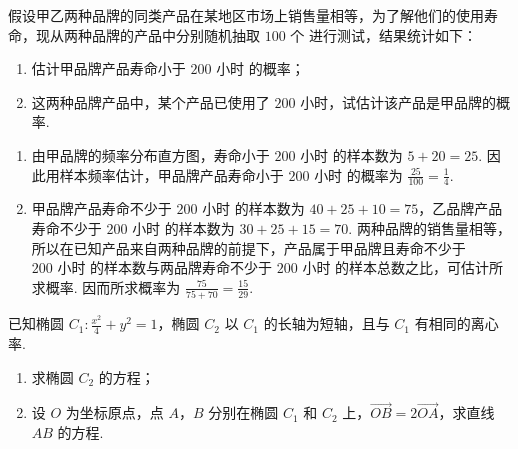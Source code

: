 \begin{problem}
假设甲乙两种品牌的同类产品在某地区市场上销售量相等，为了解他们的使用寿命，现从两种品牌的产品中分别随机抽取 \(100\text{ 个}\) 进行测试，结果统计如下：

\begin{enumerate}
\item 估计甲品牌产品寿命小于 \(200\text{ 小时}\) 的概率；
\item 这两种品牌产品中，某个产品已使用了 \(200\text{ 小时}\)，试估计该产品是甲品牌的概率.
\end{enumerate}

\begin{minipage}{\linewidth}
\centering
{}
\end{minipage}
\end{problem}

\begin{solution}
\begin{enumerate}
\item 由甲品牌的频率分布直方图，寿命小于 \(200\text{ 小时}\) 的样本数为 \(5+20=25\). 因此用样本频率估计，甲品牌产品寿命小于 \(200\text{ 小时}\) 的概率为 \(\frac{25}{100}=\frac{1}{4}\).

\item 甲品牌产品寿命不少于 \(200\text{ 小时}\) 的样本数为 \(40+25+10=75\)，乙品牌产品寿命不少于 \(200\text{ 小时}\) 的样本数为 \(30+25+15=70\). 两种品牌的销售量相等，所以在已知产品来自两种品牌的前提下，产品属于甲品牌且寿命不少于 \(200\text{ 小时}\) 的样本数与两品牌寿命不少于 \(200\text{ 小时}\) 的样本总数之比，可估计所求概率. 因而所求概率为 \(\frac{75}{75+70}=\frac{15}{29}\).
\end{enumerate}
\end{solution}

\begin{problem}
已知椭圆 \(C_1: \frac{x^2}{4} + y^2 = 1\)，椭圆 \(C_2\) 以 \(C_1\) 的长轴为短轴，且与 \(C_1\) 有相同的离心率.

\begin{enumerate}
\item 求椭圆 \(C_2\) 的方程；
\item 设 \(O\) 为坐标原点，点 \(A\)，\(B\) 分别在椭圆 \(C_1\) 和 \(C_2\) 上，\(\overrightarrow{OB} = 2\overrightarrow{OA}\)，求直线 \(AB\) 的方程.
\end{enumerate}
\end{problem}

